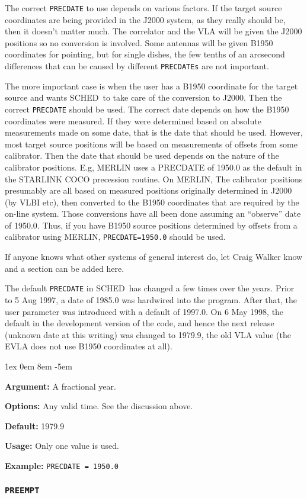 \documentclass{report}
\newcommand{\schedb}{{\sc SCHED~}}
\newcommand{\rcwbox}[5]{
  \begin{list}{}{\parsep 1ex  \itemsep 0em
                 \leftmargin 8em  \itemindent -5em }
    \item {\bf Argument:} #1
    \item {\bf Options:}  #2
    \item {\bf Default:}  #3
    \item {\bf Usage:}    #4
    \item {\bf Example:}  #5
  \end{list}
}
\begin{document}
The correct {\tt PRECDATE} to use depends on various factors.  If the
target source coordinates are being provided in the J2000 system, as
they really should be, then it doesn't matter much.  The correlator
and the VLA will be given the J2000 positions so no conversion is
involved.  Some antennas will be given B1950 coordinates for pointing,
but for single dishes, the few tenths of an arcsecond differences that
can be caused by different {\tt PRECDATEs} are not important.

The more important case is when the user has a B1950 coordinate for
the target source and wants \schedb to take care of the conversion to
J2000.  Then the correct {\tt PRECDATE} should be used.  The correct
date depends on how the B1950 coordinates were measured.  If they
were determined based on absolute measurements made on some date,
that is the date that should be used.  However, most target source
positions will be based on measurements of offsets from some
calibrator.  Then the date that should be used depends on the nature
of the calibrator positions.  
E.g, MERLIN uses a PRECDATE of 1950.0 as the default in the STARLINK
COCO precession routine.  On MERLIN, The calibrator positions
presumably are all based on measured positions originally determined
in J2000 (by VLBI etc), then converted to the B1950 coordinates that
are required by the on-line system.  Those conversions have all been
done assuming an ``observe'' date of 1950.0.  Thus, if you have B1950
source positions determined by offsets from a calibrator using MERLIN,
{\tt PRECDATE=1950.0} should be used.

If anyone knows what other systems of general interest do, let
Craig Walker know and a section can be added here.

The default {\tt PRECDATE} in \schedb has changed a few times over the
years.  Prior to 5 Aug 1997, a date of 1985.0 was hardwired into
the program.  After that, the user parameter was introduced with a
default of 1997.0.  On 6 May 1998, the default in the development
version of the code, and hence the next release (unknown date at this
writing) was changed to 1979.9, the old VLA value (the EVLA does not
use B1950 coordinates at all).

\rcwbox
{A fractional year.}
{Any valid time.  See the discussion above.}
{1979.9}
{Only one value is used.}
{{\tt PRECDATE = 1950.0}}

\subsubsection{\label{MP:PREEMPT}{\tt PREEMPT}}
\end{document}
